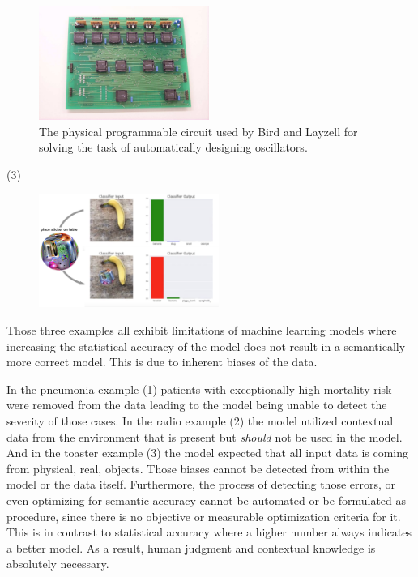 \begin{figure}
\centering
\includegraphics[height=10em]{tex/introduction/emradio.png}
\caption{
The physical programmable circuit used by Bird and Layzell \cite{Bird:2002:ERI:1251972.1252349} for solving the task of automatically designing oscillators.
}
\label{figs:emradio}
\end{figure}

\par \noindent (3)

\begin{figure}
\centering
\includegraphics[height=10em]{tex/introduction/adversarialtoaster.png}
\caption{
}
\label{figs:toaster}
\end{figure}

Those three examples all exhibit limitations of machine learning models where increasing the statistical accuracy of the model does not result in a semantically more correct model.
This is due to inherent biases of the data.

In the pneumonia example (1) patients with exceptionally high mortality risk were removed from the data leading to the model being unable to detect the severity of those cases.
In the radio example (2) the model utilized contextual data from the environment that is present but \emph{should} not be used in the model.
And in the toaster example (3) the model expected that all input data is coming from physical, real, objects.
Those biases cannot be detected from within the model or the data itself.
Furthermore, the process of detecting those errors, or even optimizing for semantic accuracy cannot be automated or be formulated as procedure, since there is no objective or measurable optimization criteria for it.
This is in contrast to statistical accuracy where a higher number always indicates a better model.
As a result, human judgment and contextual knowledge is absolutely necessary.

